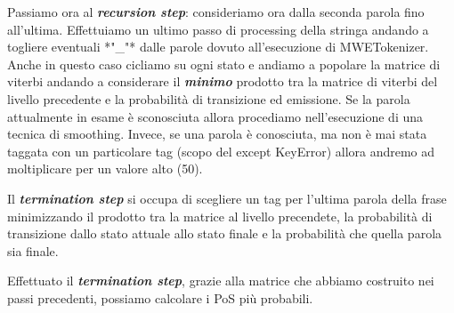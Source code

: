 \documentclass[11pt]{article}
\begin{document}
Passiamo ora al \textbf{\emph{recursion step}}: consideriamo ora dalla
seconda parola fino all'ultima. Effettuiamo un ultimo passo di
processing della stringa andando a togliere eventuali *"\_"* dalle
parole dovuto all'esecuzione di MWETokenizer. Anche in questo caso
cicliamo su ogni stato e andiamo a popolare la matrice di viterbi
andando a considerare il \textbf{\emph{minimo}} prodotto tra la matrice
di viterbi del livello precedente e la probabilità di transizione ed
emissione. Se la parola attualmente in esame è sconosciuta allora
procediamo nell'esecuzione di una tecnica di smoothing. Invece, se una
parola è conosciuta, ma non è mai stata taggata con un particolare tag
(scopo del except KeyError) allora andremo ad moltiplicare per un valore
alto (50).

Il \textbf{\emph{termination step}} si occupa di scegliere un tag per
l'ultima parola della frase minimizzando il prodotto tra la matrice al
livello precendete, la probabilità di transizione dallo stato attuale
allo stato finale e la probabilità che quella parola sia finale.

Effettuato il \textbf{\emph{termination step}}, grazie alla matrice che
abbiamo costruito nei passi precedenti, possiamo calcolare i PoS più
probabili.
\end{document}
